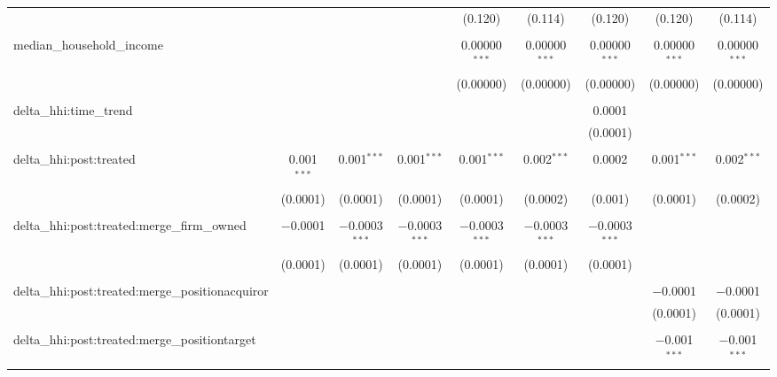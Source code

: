 \begin{table}[H]
{\begin{tabular}{@{\extracolsep{5pt}}lcccccccc}
   &  &  &  & (0.120) & (0.114) & (0.120) & (0.120) & (0.114) \\  

   & & & & & & & & \\  

  median\_household\_income &  &  &  & 0.00000$^{***}$ & 0.00000$^{***}$ & 0.00000$^{***}$ & 0.00000$^{***}$ & 0.00000$^{***}$ \\  

   &  &  &  & (0.00000) & (0.00000) & (0.00000) & (0.00000) & (0.00000) \\  

   & & & & & & & & \\  

  delta\_hhi:time\_trend &  &  &  &  &  & 0.0001 &  &  \\  

   &  &  &  &  &  & (0.0001) &  &  \\  

   & & & & & & & & \\  

  delta\_hhi:post:treated & 0.001$^{***}$ & 0.001$^{***}$ & 0.001$^{***}$ & 0.001$^{***}$ & 0.002$^{***}$ & 0.0002 & 0.001$^{***}$ & 0.002$^{***}$ \\  

   & (0.0001) & (0.0001) & (0.0001) & (0.0001) & (0.0002) & (0.001) & (0.0001) & (0.0002) \\  

   & & & & & & & & \\  

  delta\_hhi:post:treated:merge\_firm\_owned & $-$0.0001 & $-$0.0003$^{***}$ & $-$0.0003$^{***}$ & $-$0.0003$^{***}$ & $-$0.0003$^{***}$ & $-$0.0003$^{***}$ &  &  \\  

   & (0.0001) & (0.0001) & (0.0001) & (0.0001) & (0.0001) & (0.0001) &  &  \\  

   & & & & & & & & \\  

  delta\_hhi:post:treated:merge\_positionacquiror &  &  &  &  &  &  & $-$0.0001 & $-$0.0001 \\  

   &  &  &  &  &  &  & (0.0001) & (0.0001) \\  

   & & & & & & & & \\  

  delta\_hhi:post:treated:merge\_positiontarget &  &  &  &  &  &  & $-$0.001$^{***}$ & $-$0.001$^{***}$ \\  


\end{tabular}}
\end{table}
